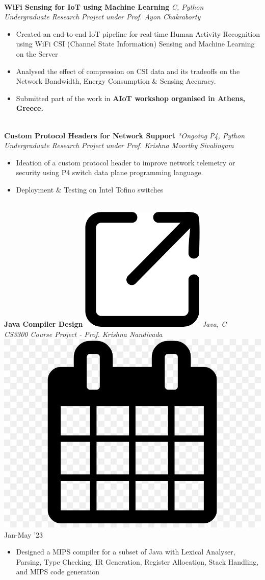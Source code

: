 \documentclass[10pt,article]{article}
\newcommand{\myMargin}{0.15in}
\newcommand{\myfont}[2]{\fontsize{#1}{#1}\selectfont #2}
\newcommand{\projecttopic}[1]{\myfont{9pt}{\textbf{#1}}}
\newcommand{\projectdesc}[1]{\myfont{9pt}{\textcolor{projDescColor}{\textit{#1}}}}
\newcommand{\mylink}[1]{\href{#1}{\includegraphics[scale=0.03]{download.png}}}
\newcommand{\mycal}[1]{\includegraphics[scale=0.018]{calendar.png} \myfont{9}{#1}}
\begin{document}
\begin{multicols*}{2}
\noindent
\hrulefill \\ [-0.45cm]
\projecttopic{WiFi Sensing for IoT using Machine Learning} \hfill \textcolor{projDescColor}{\textit{C, Python}} \\ [0.1cm]
\projectdesc{Undergraduate Research Project under Prof. Ayon Chakraborty}
\begin{itemize}[leftmargin=\myMargin]
    \setlength \itemsep{-0.1em}
    \item Created an end-to-end IoT pipeline for real-time Human Activity Recognition using WiFi CSI (Channel State Information) Sensing and Machine Learning on the Server
    \item Analysed the effect of compression on CSI data and its tradeoffs on the Network Bandwidth, Energy Consumption \& Sensing Accuracy.
    \item Submitted part of the work in \textbf{AIoT workshop organised in Athens, Greece.} 
\end{itemize}
\vspace{3pt} 
\noindent
\hrulefill \\ [-0.45cm]
\projecttopic{Custom Protocol Headers for Network Support} \textit{*Ongoing} \hfill \textcolor{projDescColor}{\textit{P4, Python}}\\[0.1cm]
\projectdesc{Undergraduate Research Project under Prof. Krishna Moorthy Sivalingam}
\vspace{1pt}
\begin{itemize}[leftmargin=\myMargin]
    \setlength \itemsep{-0.1em}
    \item Ideation of a custom protocol header to improve network telemetry or security using P4 switch data plane programming language.
    \item Deployment \& Testing on Intel Tofino switches  
\end{itemize}
\vspace{3pt}

\noindent
\hrulefill \\ [-0.45cm]
\projecttopic{Java Compiler Design}
\mylink{https://github.com/Snehadeep-Gayen/Compiler-Design-HW}
\hfill    \textcolor{projDescColor}{\textit{Java, C}}  \\[0.1cm]
\projectdesc{CS3300 Course Project - Prof. Krishna Nandivada} \hfill \mycal{Jan-May '23} \\
\noindent
\vspace{-0.4cm}
\begin{itemize}[leftmargin=\myMargin]
    \item Designed a MIPS compiler for a subset of Java with Lexical Analyser, Parsing, Type Checking, IR Generation, Register Allocation, Stack Handling, and MIPS code generation
\end{itemize}
\vspace{5pt}


\end{multicols*}
\end{document}
